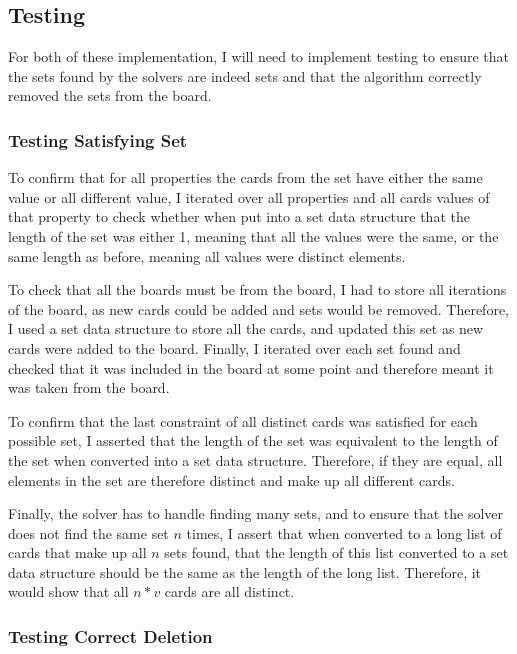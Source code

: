 \documentclass[pageno]{jpaper}
\begin{document}
\subsection{Testing}

For both of these implementation, I will need to implement testing to ensure that the sets found by the solvers are indeed sets and that the algorithm correctly removed the sets from the board. 

\subsubsection{Testing Satisfying Set}

To confirm that for all properties the cards from the set have either the same value or all different value, I iterated over all properties and all cards values of that property to check whether when put into a set data structure that the length of the set was either 1, meaning that all the values were the same, or the same length as before, meaning all values were distinct elements. 

To check that all the boards must be from the board, I had to store all iterations of the board, as new cards could be added and sets would be removed. Therefore, I used a set data structure to store all the cards, and updated this set as new cards were added to the board. Finally, I iterated over each set found and checked that it was included in the board at some point and therefore meant it was taken from the board. 

To confirm that the last constraint of all distinct cards was satisfied for each possible set, I asserted that the length of the set was equivalent to the length of the set when converted into a set data structure. Therefore, if they are equal, all elements in the set are therefore distinct and make up all different cards.

Finally, the solver has to handle finding many sets, and to ensure that the solver does not find the same set $n$ times, I assert that when converted to a long list of cards that make up all $n$ sets found, that the length of this list converted to a set data structure should be the same as the length of the long list. Therefore, it would show that all $n*v$ cards are all distinct. 

\subsubsection{Testing Correct Deletion}
\end{document}
